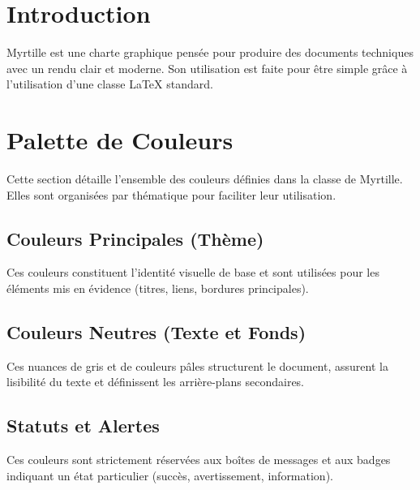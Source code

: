 \section{Introduction}
Myrtille est une charte graphique pensée pour produire des documents techniques avec un rendu clair et moderne. Son utilisation est faite pour être simple grâce à l'utilisation d'une classe \LaTeX{} standard. 

\section{Palette de Couleurs}

Cette section détaille l'ensemble des couleurs définies dans la classe de Myrtille. Elles sont organisées par thématique pour faciliter leur utilisation.

\subsection{Couleurs Principales (Thème)}
Ces couleurs constituent l'identité visuelle de base et sont utilisées pour les éléments mis en évidence (titres, liens, bordures principales).

\vspace{10pt}

\subsection{Couleurs Neutres (Texte et Fonds)}
Ces nuances de gris et de couleurs pâles structurent le document, assurent la lisibilité du texte et définissent les arrière-plans secondaires.

\vspace{10pt}

\subsection{Statuts et Alertes}
Ces couleurs sont strictement réservées aux boîtes de messages et aux badges indiquant un état particulier (succès, avertissement, information).

\vspace{10pt}

